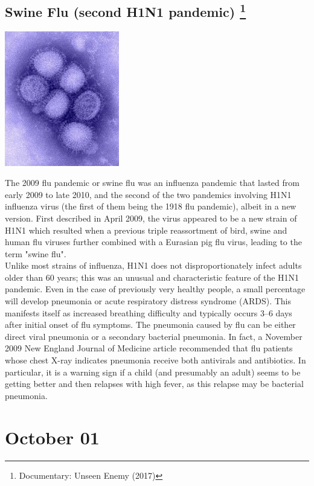 \documentclass[11pt]{report}
\begin{document}
\subsection{Swine Flu (second H1N1 pandemic) \protect\footnote{Documentary: Unseen Enemy (2017)}}
\vspace{2mm}\begin{center}\includegraphics[width=5cm]{./img/h1N1.jpg}\end{center}
The 2009 flu pandemic or swine flu was an influenza pandemic that lasted from early 2009 to late 2010, and the second of the two pandemics involving H1N1 influenza virus (the first of them being the 1918 flu pandemic), albeit in a new version. First described in April 2009, the virus appeared to be a new strain of H1N1 which resulted when a previous triple reassortment of bird, swine and human flu viruses further combined with a Eurasian pig flu virus, leading to the term "swine flu".\\
\indent Unlike most strains of influenza, H1N1 does not disproportionately infect adults older than 60 years; this was an unusual and characteristic feature of the H1N1 pandemic. Even in the case of previously very healthy people, a small percentage will develop pneumonia or acute respiratory distress syndrome (ARDS). This manifests itself as increased breathing difficulty and typically occurs 3–6 days after initial onset of flu symptoms. The pneumonia caused by flu can be either direct viral pneumonia or a secondary bacterial pneumonia. In fact, a November 2009 New England Journal of Medicine article recommended that flu patients whose chest X-ray indicates pneumonia receive both antivirals and antibiotics. In particular, it is a warning sign if a child (and presumably an adult) seems to be getting better and then relapses with high fever, as this relapse may be bacterial pneumonia.
\section{October 01}
\end{document}

